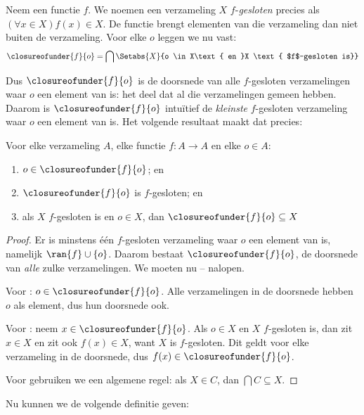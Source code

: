 \documentclass[openany]{memoir}
\begin{document}
\begin{defn}
	Neem een functie $f$. We noemen een verzameling $X$ $f$-\emph{gesloten}
	{precies als} $(\forall x \in X)f(x) \in X$. De functie brengt
	elementen van die verzameling dan niet buiten de verzameling. Voor
	elke $o$ leggen we nu vast:
	$$\closureofunder{f}{o} = \bigcap\Setabs{X}{o \in X\text{ en }X
\text{ $f$-gesloten is}}$$
\end{defn}

Dus $\closureofunder{f}{o}$ is de doorsnede van alle $f$-gesloten
verzamelingen waar $o$ een element van is: het deel dat al die
verzamelingen gemeen hebben. Daarom is $\closureofunder{f}{o}$
intuïtief de \emph{kleinste} $f$-gesloten verzameling waar $o$ een
element van is. Het volgende resultaat maakt dat precies:
\begin{lem}
	Voor elke verzameling $A$, elke functie $f \colon A \to A$ en elke
	$o \in A$:
	\begin{enumerate}
		\item{} $o \in \closureofunder{f}{o}$; en
		\item{} $\closureofunder{f}{o}$ is $f$-gesloten; en
		\item{} als $X$ $f$-gesloten is en $o \in
		X$, dan $\closureofunder{f}{o} \subseteq X$
	\end{enumerate}
\end{lem}

\begin{proof}
Er is minstens één $f$-gesloten verzameling waar $o$ een element van
is, namelijk $\ran{f}\cup \{o\}$. Daarom bestaat
$\closureofunder{f}{o}$, de doorsnede van \emph{alle} zulke
verzamelingen. We moeten nu
-- nalopen.

Voor : $o \in \closureofunder{f}{o}$. Alle
verzamelingen in de doorsnede hebben $o$ als element, dus hun doorsnede
ook.

Voor : neem $x \in \closureofunder{f}{o}$. Als
$o \in X$ en $X$ $f$-gesloten is, dan zit $x \in X$ en zit ook
$f(x) \in X$, want $X$ is $f$-gesloten. Dit geldt voor elke verzameling
in de doorsnede, dus $f(x) \in \closureofunder{f}{o}$.

Voor  gebruiken we een algemene regel: als
$X \in C$, dan $\bigcap C \subseteq X$.
\end{proof}

Nu kunnen we de volgende definitie geven:
\end{document}
